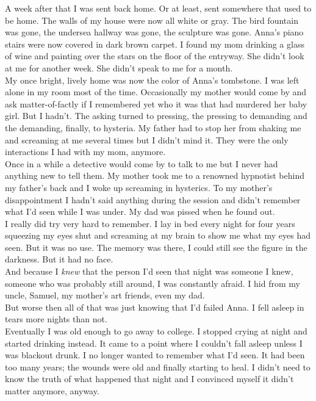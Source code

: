 \documentclass[a5paper]{scrartcl}
\begin{document}
A week after that I was sent back home. Or at least, sent somewhere that used to be home. The walls of my house were now all white or gray. The bird fountain was gone, the undersea hallway was gone, the sculpture was gone. Anna's piano stairs were now covered in dark brown carpet.  I found my mom drinking a glass of wine and painting over the stars on the floor of the entryway. She didn't look at me for another week. She didn't speak to me for a month.\\


My once bright, lively home was now the color of Anna's tombstone. I was left alone in my room most of the time. Occasionally my mother would come by and ask matter-of-factly if I remembered yet who it was that had murdered her baby girl. But I hadn't. The asking turned to pressing, the pressing to demanding and the demanding, finally, to hysteria. My father had to stop her from shaking me and screaming at me several times but I didn't mind it. They were the only interactions I had with my mom, anymore. \\


Once in a while a detective would come by to talk to me but I never had anything new to tell them. My mother took me to a renowned hypnotist behind my father's back and I woke up screaming in hysterics. To my mother's disappointment I hadn't said anything during the session and didn't remember what I'd seen while I was under. My dad was pissed when he found out. \\


I really did try very hard to remember. I lay in bed every night for four years squeezing my eyes shut and screaming at my brain to show me what my eyes had seen. But it was no use. The memory was there, I could still see the figure in the darkness. But it had no face.\\


And because I \textit{knew}
 that the person I'd seen that night was someone I knew, someone who was probably still around, I was constantly afraid. I hid from my uncle, Samuel, my mother's art friends, even my dad. \\


But worse then all of that was just knowing that I'd failed Anna. I fell asleep in tears more nights than not.\\


Eventually I was old enough to go away to college. I stopped crying at night and started drinking instead. It came to a point where I couldn't fall asleep unless I was blackout drunk.  I no longer wanted to remember what I'd seen. It had been too many years; the wounds were old and finally starting to heal. I didn't need to know the truth of what happened that night and I convinced myself it didn't matter anymore, anyway. \\
\end{document}
